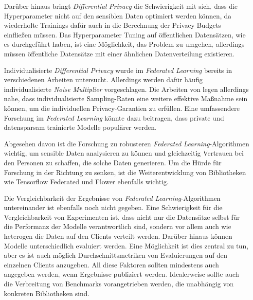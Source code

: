 Darüber hinaus bringt \textit{Differential Privacy} die Schwierigkeit mit sich, dass die Hyperparameter nicht auf den sensiblen Daten optimiert werden können, da wiederholte Trainings dafür auch in die Berechnung der Privacy-Budgets einfließen müssen. Das Hyperparameter Tuning auf öffentlichen Datensätzen, wie es \textcite{ramaswamy:2020} durchgeführt haben, ist eine Möglichkeit, das Problem zu umgehen, allerdings müssen öffentliche Datensätze mit einer ähnlichen Datenverteilung existieren.

Individualisierte \textit{Differential Privacy} wurde im \textit{Federated Learning} bereits in verschiedenen Arbeiten untersucht. Allerdings werden dafür häufig individualisierte \textit{Noise Multiplier} vorgeschlagen. Die Arbeiten von \textcite{jorgensen:2015, boenisch:2023} legen allerdings nahe, dass individualisierte Sampling-Raten eine weitere effektive Maßnahme sein können, um die individuellen Privacy-Garantien zu erfüllen. Eine umfassendere Forschung im \textit{Federated Learning} könnte dazu beitragen, dass private und datensparsam trainierte Modelle populärer werden.

Abgesehen davon ist die Forschung zu robusteren \textit{Federated Learning}-Algorithmen wichtig, um sensible Daten analysieren zu können und gleichzeitig Vertrauen bei den Personen zu schaffen, die solche Daten generieren. Um die Hürde für Forschung in der Richtung zu senken, ist die Weiterentwicklung von Bibliotheken wie Tensorflow Federated und Flower \cite{beutel:2020} ebenfalls wichtig. 

Die Vergleichbarkeit der Ergebnisse von \textit{Federated Learning}-Algorithmen untereinander ist ebenfalls noch nicht gegeben. Eine Schwierigkeit für die Vergleichbarkeit von Experimenten ist, dass nicht nur die Datensätze selbst für die Performanz der Modelle verantwortlich sind, sondern vor allem auch wie heterogen die Daten auf den Clients verteilt werden. Darüber hinaus können Modelle unterschiedlich evaluiert werden. Eine Möglichkeit ist dies zentral zu tun, aber es ist auch möglich Durchschnittsmetriken von Evaluierungen auf den einzelnen Clients anzugeben. All diese Faktoren sollten mindestens auch angegeben werden, wenn Ergebnisse publiziert werden. Idealerweise sollte auch die Verbreitung von Benchmarks vorangetrieben werden, die unabhängig von konkreten Bibliotheken sind.